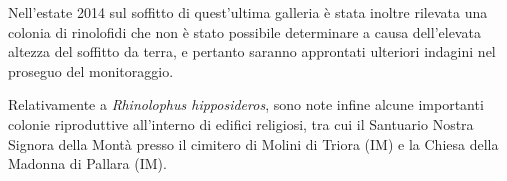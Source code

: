 {Nell’estate 2014 sul soffitto di quest’ultima galleria è stata inoltre rilevata una colonia di rinolofidi che non è stato possibile determinare a causa dell’elevata altezza del soffitto da terra, e pertanto saranno approntati ulteriori indagini nel proseguo del monitoraggio.

Relativamente a \emph{Rhinolophus hipposideros}, sono note infine alcune importanti colonie riproduttive all’interno di edifici religiosi, tra cui il Santuario Nostra Signora della Montà presso il cimitero di Molini di Triora (IM) e la Chiesa della Madonna di Pallara (IM).
} %